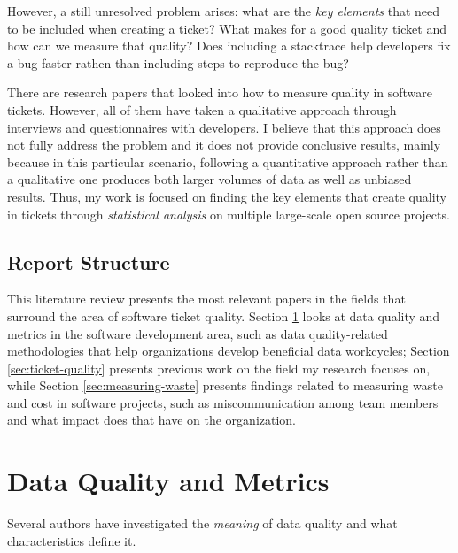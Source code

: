 \documentclass[11pt,english,twocolumn]{article}
\begin{document}
However, a still unresolved problem arises: what are the \emph{key 
elements} that need to be included when creating a ticket? What makes for a good quality ticket
and how can we measure that quality? Does including a stacktrace help developers fix a bug 
faster rathen than including steps to reproduce the bug?

There are research papers that looked into how to measure quality in software tickets. However,
all of them have taken a qualitative approach through interviews and questionnaires with
developers. I believe that this approach does not fully address the problem and it does not provide
conclusive results, mainly because in this particular scenario, following a quantitative approach
rather than a qualitative one produces both larger volumes of data as well as unbiased results.
Thus, my work is focused on finding the key elements that create quality
in tickets through \emph{statistical analysis} on multiple large-scale open source projects.

\subsection*{Report Structure}
\label{sec:label-subsection}

This literature review presents the most relevant papers in the fields that surround the
area of software ticket quality. Section \ref{sec:data-quality} looks at data quality and 
metrics in the software development area, such as data quality-related methodologies that 
help organizations develop beneficial data workcycles; Section \ref{sec:ticket-quality} presents 
previous work on the field my research focuses on, while Section \ref{sec:measuring-waste} 
presents findings related to measuring waste and cost in software projects, such as 
miscommunication among team members and what impact does that have on the organization.

\section{Data Quality and Metrics}
\label{sec:data-quality}

Several authors have investigated the \emph{meaning} of data quality and
what characteristics define it.
\end{document}
